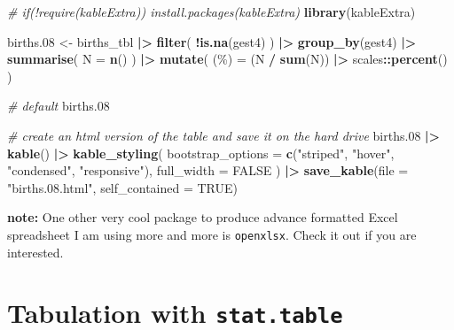 \documentclass[
]{book}
\newenvironment{Shaded}{\begin{snugshade}}{\end{snugshade}}
\newcommand{\AttributeTok}[1]{\textcolor[rgb]{0.13,0.29,0.53}{#1}}
\newcommand{\CommentTok}[1]{\textcolor[rgb]{0.56,0.35,0.01}{\textit{#1}}}
\newcommand{\ConstantTok}[1]{\textcolor[rgb]{0.56,0.35,0.01}{#1}}
\newcommand{\FloatTok}[1]{\textcolor[rgb]{0.00,0.00,0.81}{#1}}
\newcommand{\FunctionTok}[1]{\textcolor[rgb]{0.13,0.29,0.53}{\textbf{#1}}}
\newcommand{\NormalTok}[1]{#1}
\newcommand{\OtherTok}[1]{\textcolor[rgb]{0.56,0.35,0.01}{#1}}
\newcommand{\SpecialCharTok}[1]{\textcolor[rgb]{0.81,0.36,0.00}{\textbf{#1}}}
\newcommand{\StringTok}[1]{\textcolor[rgb]{0.31,0.60,0.02}{#1}}
\theoremstyle{definition}
\theoremstyle{definition}
\theoremstyle{definition}
\theoremstyle{definition}
\theoremstyle{remark}
\begin{document}
\begin{Shaded}
\begin{Highlighting}[]
\CommentTok{\# if(!require(kableExtra)) install.packages(\textquotesingle{}kableExtra\textquotesingle{})}
\FunctionTok{library}\NormalTok{(kableExtra)}

\NormalTok{births}\FloatTok{.08} \OtherTok{\textless{}{-}}
\NormalTok{  births\_tbl }\SpecialCharTok{|\textgreater{}}
  \FunctionTok{filter}\NormalTok{(}
    \SpecialCharTok{!}\FunctionTok{is.na}\NormalTok{(gest4)}
\NormalTok{  ) }\SpecialCharTok{|\textgreater{}}
  \FunctionTok{group\_by}\NormalTok{(gest4) }\SpecialCharTok{|\textgreater{}}
  \FunctionTok{summarise}\NormalTok{(}
    \AttributeTok{N =} \FunctionTok{n}\NormalTok{()}
\NormalTok{  ) }\SpecialCharTok{|\textgreater{}}
  \FunctionTok{mutate}\NormalTok{(}
    \StringTok{\textasciigrave{}}\AttributeTok{(\%)}\StringTok{\textasciigrave{}} \OtherTok{=}\NormalTok{ (N }\SpecialCharTok{/} \FunctionTok{sum}\NormalTok{(N)) }\SpecialCharTok{|\textgreater{}}\NormalTok{ scales}\SpecialCharTok{::}\FunctionTok{percent}\NormalTok{()}
\NormalTok{  )}

\CommentTok{\# default}
\NormalTok{births}\FloatTok{.08}

\CommentTok{\# create an html version of the table and save it on the hard drive}
\NormalTok{births}\FloatTok{.08} \SpecialCharTok{|\textgreater{}}
  \FunctionTok{kable}\NormalTok{() }\SpecialCharTok{|\textgreater{}}
  \FunctionTok{kable\_styling}\NormalTok{(}
    \AttributeTok{bootstrap\_options =} 
      \FunctionTok{c}\NormalTok{(}\StringTok{"striped"}\NormalTok{, }\StringTok{"hover"}\NormalTok{, }\StringTok{"condensed"}\NormalTok{, }\StringTok{"responsive"}\NormalTok{),}
    \AttributeTok{full\_width =} \ConstantTok{FALSE}
\NormalTok{  ) }\SpecialCharTok{|\textgreater{}}
  \FunctionTok{save\_kable}\NormalTok{(}\AttributeTok{file =} \StringTok{"births.08.html"}\NormalTok{, }\AttributeTok{self\_contained =} \ConstantTok{TRUE}\NormalTok{)}
\end{Highlighting}
\end{Shaded}

\textbf{note:} One other very cool package to produce advance formatted Excel spreadsheet I am using more and more is \texttt{openxlsx}. Check it out if you are interested.

\chapter{\texorpdfstring{Tabulation with \texttt{stat.table}}{Tabulation with stat.table}}\label{tabulation-with-stat.table}
\end{document}

